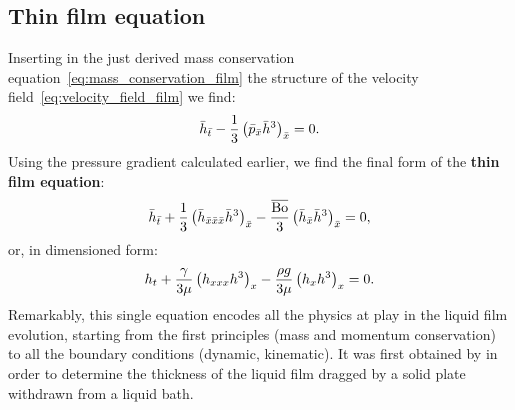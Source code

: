 \subsection{Thin film equation}
Inserting in the just derived mass conservation equation~\eqref{eq:mass_conservation_film} the structure of the velocity field~\eqref{eq:velocity_field_film} we find:
\begin{equation}
\bar h_{\bar t} - \frac{1}{3}\left(\bar p_{\bar x} \bar h^3\right)_{\bar x} = 0.
\end{equation}
Using the pressure gradient calculated earlier, we find the final form of the \textbf{thin film equation}:
\begin{equation}
\bar h_{\bar t} + \frac{1}{3}\left( \bar h_{\bar x \bar x \bar x} \bar h^3\right)_{\bar x} - \frac{\overline{\text{Bo}}}{3}\left( \bar h_{\bar x} \bar h^3\right)_{\bar x} = 0,
\end{equation}
or, in dimensioned form:
\begin{equation}
h_{t} + \frac{\gamma}{3\mu}\left( h_{xxx} h^3\right)_{x} - \frac{\rho g}{3\mu}\left( h_{x} h^3\right)_{x} = 0.
\label{eq:thin_film_equation}
\end{equation}
Remarkably, this single equation encodes all the physics at play in the liquid film evolution, starting from the first principles (mass and momentum conservation) to all the boundary conditions (dynamic, kinematic). It was first obtained by \citet{Landau1942} in order to determine the thickness of the liquid film dragged by a solid plate withdrawn from a liquid bath.
